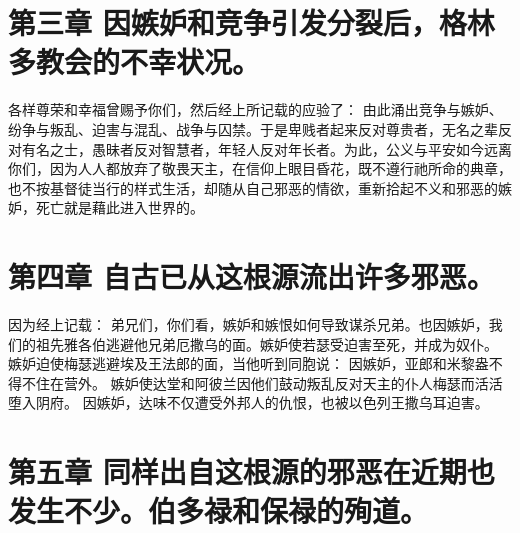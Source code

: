 
\section{第三章 因嫉妒和竞争引发分裂后，格林多教会的不幸状况。}

各样尊荣和幸福曾赐予你们，然后经上所记载的应验了： 由此涌出竞争与嫉妒、纷争与叛乱、迫害与混乱、战争与囚禁。于是卑贱者起来反对尊贵者，无名之辈反对有名之士，愚昧者反对智慧者，年轻人反对年长者。为此，公义与平安如今远离你们，因为人人都放弃了敬畏天主，在信仰上眼目昏花，既不遵行祂所命的典章，也不按基督徒当行的样式生活，却随从自己邪恶的情欲，重新拾起不义和邪恶的嫉妒，死亡就是藉此进入世界的。\par


\section{第四章 自古已从这根源流出许多邪恶。}

因为经上记载： 弟兄们，你们看，嫉妒和嫉恨如何导致谋杀兄弟。也因嫉妒，我们的祖先雅各伯逃避他兄弟厄撒乌的面。嫉妒使若瑟受迫害至死，并成为奴仆。 嫉妒迫使梅瑟逃避埃及王法郎的面，当他听到同胞说： 因嫉妒，亚郎和米黎盎不得不住在营外。 嫉妒使达堂和阿彼兰因他们鼓动叛乱反对天主的仆人梅瑟而活活堕入阴府。 因嫉妒，达味不仅遭受外邦人的仇恨，也被以色列王撒乌耳迫害。\par


\section{第五章 同样出自这根源的邪恶在近期也发生不少。伯多禄和保禄的殉道。}

